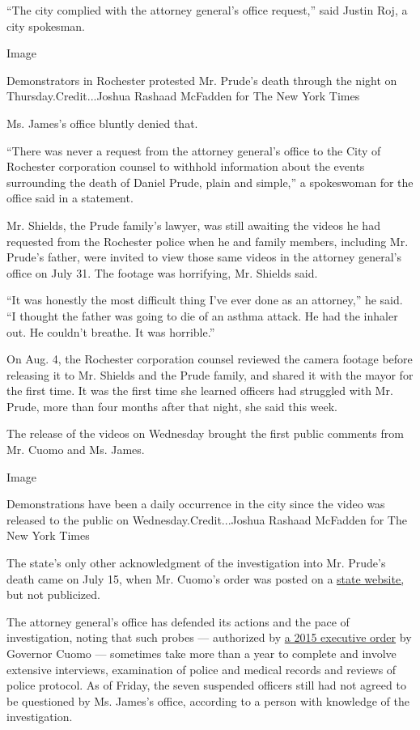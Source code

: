 ``The city complied with the attorney general's office request,'' said
Justin Roj, a city spokesman.

Image

Demonstrators in Rochester protested Mr. Prude's death through the night
on Thursday.Credit...Joshua Rashaad McFadden for The New York Times

Ms. James's office bluntly denied that.

``There was never a request from the attorney general's office to the
City of Rochester corporation counsel to withhold information about the
events surrounding the death of Daniel Prude, plain and simple,'' a
spokeswoman for the office said in a statement.

Mr. Shields, the Prude family's lawyer, was still awaiting the videos he
had requested from the Rochester police when he and family members,
including Mr. Prude's father, were invited to view those same videos in
the attorney general's office on July 31. The footage was horrifying,
Mr. Shields said.

``It was honestly the most difficult thing I've ever done as an
attorney,'' he said. ``I thought the father was going to die of an
asthma attack. He had the inhaler out. He couldn't breathe. It was
horrible.''

On Aug. 4, the Rochester corporation counsel reviewed the camera footage
before releasing it to Mr. Shields and the Prude family, and shared it
with the mayor for the first time. It was the first time she learned
officers had struggled with Mr. Prude, more than four months after that
night, she said this week.

The release of the videos on Wednesday brought the first public comments
from Mr. Cuomo and Ms. James.

Image

Demonstrations have been a daily occurrence in the city since the video
was released to the public on Wednesday.Credit...Joshua Rashaad McFadden
for The New York Times

The state's only other acknowledgment of the investigation into Mr.
Prude's death came on July 15, when Mr. Cuomo's order was posted on a
\href{https://www.governor.ny.gov/news/no-14735-amendment-executive-order-147-special-prosecutor-investigate-and-prosecute-matters}{state
website,} but not publicized.

The attorney general's office has defended its actions and the pace of
investigation, noting that such probes --- authorized by
\href{https://www.governor.ny.gov/sites/governor.ny.gov/files/atoms/old-files//EO147.pdf}{a
2015 executive order} by Governor Cuomo --- sometimes take more than a
year to complete and involve extensive interviews, examination of police
and medical records and reviews of police protocol. As of Friday, the
seven suspended officers still had not agreed to be questioned by Ms.
James's office, according to a person with knowledge of the
investigation.

